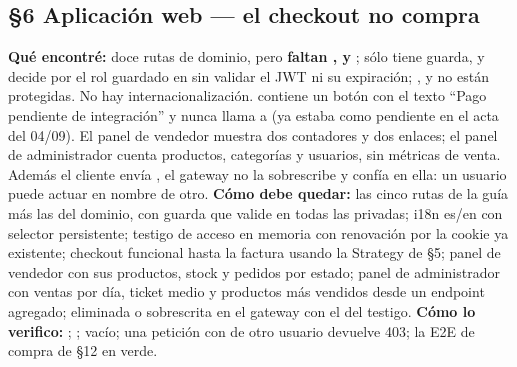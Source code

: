 \subsection*{\S6 Aplicaci\'on web --- el checkout no compra}
\textbf{Qu\'e encontr\'e:} doce rutas de dominio, pero \textbf{faltan ,  y }; s\'olo  tiene guarda, y decide por el rol guardado en  sin validar el JWT ni su expiraci\'on; ,  y  no est\'an protegidas. No hay internacionalizaci\'on.  contiene un bot\'on  con el texto ``Pago pendiente de integraci\'on'' y nunca llama a  (ya estaba como pendiente en el acta del 04/09). El panel de vendedor muestra dos contadores y dos enlaces; el panel de administrador cuenta productos, categor\'ias y usuarios, sin m\'etricas de venta. Adem\'as el cliente env\'ia , el gateway no la sobrescribe y  conf\'ia en ella: un usuario puede actuar en nombre de otro. \textbf{C\'omo debe quedar:} las cinco rutas de la gu\'ia m\'as las del dominio, con guarda que valide  en todas las privadas; i18n es/en con selector persistente; testigo de acceso en memoria con renovaci\'on por la cookie  ya existente; checkout funcional hasta la factura usando la Strategy de \S5; panel de vendedor con sus productos, stock y pedidos por estado; panel de administrador con ventas por d\'ia, ticket medio y productos m\'as vendidos desde un endpoint agregado;  eliminada o sobrescrita en el gateway con el  del testigo. \textbf{C\'omo lo verifico:} ; ;  vac\'io; una petici\'on con  de otro usuario devuelve 403; la E2E de compra de \S12 en verde.

